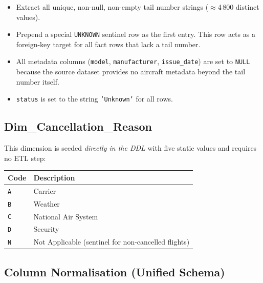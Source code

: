 \documentclass[12pt,a4paper]{article}
\begin{document}
\begin{itemize}
    \item Extract all unique, non-null, non-empty tail number strings
          ($\approx$4\,800 distinct values).
    \item Prepend a special \texttt{UNKNOWN} sentinel row as the first entry.
          This row acts as a foreign-key target for all fact rows that lack a
          tail number.
    \item All metadata columns (\texttt{model}, \texttt{manufacturer},
          \texttt{issue\_date}) are set to \texttt{NULL} because the source
          dataset provides no aircraft metadata beyond the tail number itself.
    \item \texttt{status} is set to the string \texttt{'Unknown'} for all rows.
\end{itemize}

\subsection{Dim\_Cancellation\_Reason}

This dimension is seeded \emph{directly in the DDL} with five static values
and requires no ETL step:

\begin{center}
\begin{tabular}{ll}
\toprule
\textbf{Code} & \textbf{Description} \\
\midrule
\texttt{A} & Carrier \\
\texttt{B} & Weather \\
\texttt{C} & National Air System \\
\texttt{D} & Security \\
\texttt{N} & Not Applicable (sentinel for non-cancelled flights) \\
\bottomrule
\end{tabular}
\end{center}

\subsection{Column Normalisation (Unified Schema)}
\end{document}
